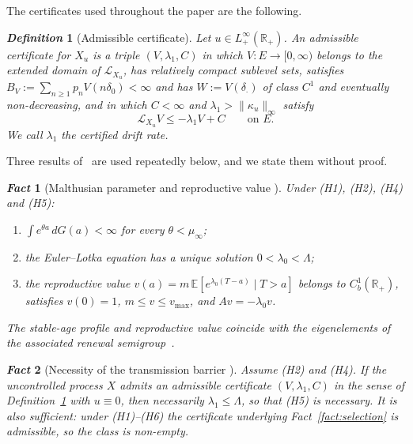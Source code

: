 \documentclass[letterpaper, 10pt, conference]{ieeeconf}
\newtheorem{definition}{\it \textbf{Definition}}
\newtheorem{fact}{\it \textbf{Fact}}
\newcommand{\E}{\mathbb{E}}
\newcommand{\R}{\mathbb{R}}
\newcommand{\Lbar}{\Lambda}
\newcommand{\rev}[1]{#1}
\newcommand{\ed}[1]{#1}
\begin{document}
\ed{The certificates used throughout the paper are the following.}
\begin{definition}[\ed{Admissible certificate}]
\label{def:cert}
\ed{Let $u\in L^\infty_+(\R_+)$. An \emph{admissible certificate} for $X_u$ is
a triple $(V,\lambda_1,C)$ in which $V:E\to[0,\infty)$ belongs to the extended
domain of $\mathcal L_{X_u}$, has relatively compact sublevel sets, satisfies
$B_V:=\sum_{n\ge1}p_nV(n\delta_0)<\infty$ and has $W:=V(\delta_\cdot)$ of class
$C^1$ and eventually non-decreasing, and in which $C<\infty$ and
$\lambda_1>\|\kappa_u\|_\infty$ satisfy}
\[
\ed{\mathcal L_{X_u}V\le-\lambda_1V+C \qquad\text{on }E .}
\]
\ed{We call $\lambda_1$ the certified drift rate.}
\end{definition}
\rev{Three results of~\cite{companion} are used repeatedly below, and we state
them without proof.}
\begin{fact}[Malthusian parameter and reproductive value {\rm\cite[Lem.~2.2]{companion}}]
\label{fact:malthus}
Under {\rm(H1), (H2), (H4)} and {\rm(H5)}:
\begin{enumerate}\itemsep1pt
\item[(i)] $\int e^{\theta a}\,dG(a)<\infty$ for every $\theta<\mu_\infty$;
\item[(ii)] the Euler--Lotka equation has a unique solution
$0<\lambda_0<\Lbar$;
\item[(iii)] the reproductive value $v(a)=m\,\E[e^{\lambda_0(T-a)}\mid T>a]$
belongs to $C_b^1(\R_+)$, satisfies $v(0)=1$, $m\le v\le v_{\max}$, and
$Av=-\lambda_0v$.
\end{enumerate}
The stable-age profile and reproductive value coincide with the eigenelements of
the associated renewal semigroup~\cite[Thm.~3.8]{bansaye2020}.
\end{fact}
\begin{fact}[Necessity of the transmission barrier {\rm\cite[Prop.~3.2]{companion}}]
\label{fact:necessity}
Assume {\rm(H2)} and {\rm(H4)}. \ed{If the uncontrolled process $X$ admits an
admissible certificate $(V,\lambda_1,C)$ in the sense of
Definition~\ref{def:cert} with $u\equiv0$, then necessarily
$\lambda_1\le\Lbar$, so that {\rm(H5)} is necessary. It is also sufficient:
under {\rm(H1)--(H6)} the certificate underlying Fact~\ref{fact:selection}
is admissible, so the class is non-empty.}
\end{fact}
\end{document}
